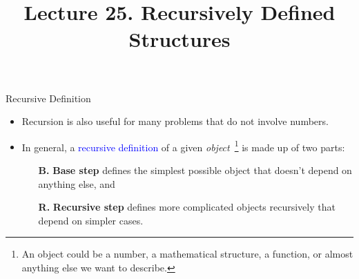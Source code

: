 \documentclass[aspectratio=169]{beamer}
\title{Lecture 25. Recursively Defined  Structures}
\date{ }
\providecommand{\Blue}[1]{\textcolor{blue}{#1}}
\begin{document}
\frame[plain]{\titlepage}




\begin{frame}[plain]{Recursive Definition}

 \begin{itemize}
  \item Recursion is also  useful for many problems that do not involve numbers.
  \item In general, a \Blue{recursive definition} of a given \emph{object}~\footnote{ 
      An object could be a number, a mathematical structure, a function, or almost anything else we want to 
         describe.}
         is made up of two parts:
         \begin{itemize}
          \item[{\bf B.}] {\bf Base step} defines the simplest possible object that doesn't depend on anything else, and
          \item[{\bf R.}] {\bf Recursive  step}
             defines more complicated objects recursively that depend on simpler cases.
         \end{itemize}
        
 \end{itemize}

\end{frame}
\end{document}
